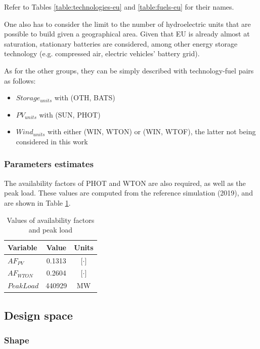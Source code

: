 Refer to Tables \ref{table:technologies-eu} and \ref{table:fuels-eu} for their names.

One also has to consider the limit to the number of hydroelectric units that are possible to build given a geographical area. Given that EU is already almost at saturation, stationary batteries are considered, among other energy storage technology (e.g. compressed air, electric vehicles' battery grid).

As for the other groups, they can be simply described with technology-fuel pairs as follows:
\begin{itemize}
    \item $Storage_{units}$ with (OTH, BATS)
    \item $PV_{units}$ with (SUN, PHOT)
    \item $Wind_{units}$ with either (WIN, WTON) or (WIN, WTOF), the latter not being considered in this work
\end{itemize}

\subsubsection{Parameters estimates}

The availability factors of PHOT and WTON are also required, as well as the peak load. These values are computed from the reference simulation (2019), and are shown in Table \ref{table:param-values}.


\begin{table}[h]
    \centering
    \begin{tabular}{|l c c|}
        \hline
        Variable     & Value  & Units \\ \hline
        $AF_{PV}$    & 0.1313 & [$\cdot$]    \\
        $AF_{WTON}$  & 0.2604 & [$\cdot$]   \\
        $PeakLoad$   & 440929 & MW    \\ \hline
    \end{tabular}
    \caption{Values of availability factors and peak load}
    \label{table:param-values}
\end{table}

\subsection{Design space}

\subsubsection{Shape}

